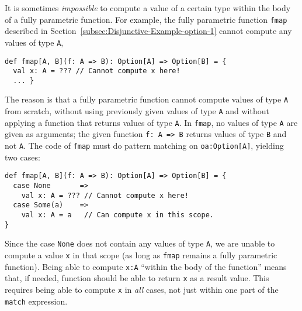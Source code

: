 It is sometimes \emph{impossible} to compute a value of a certain
type within the body of a fully parametric function. For example,
the fully parametric function \lstinline!fmap!
described in Section~\ref{subsec:Disjunctive-Example-option-1} cannot
compute any values of type \lstinline!A!,
\begin{lstlisting}
def fmap[A, B](f: A => B): Option[A] => Option[B] = {
  val x: A = ??? // Cannot compute x here!
  ... }
\end{lstlisting}
The reason is that a fully parametric function cannot compute values
of type \lstinline!A! from
scratch, without using previously given values of type \lstinline!A!
and without applying a function that returns values of type \lstinline!A!.
In \lstinline!fmap!, no
values of type \lstinline!A!
are given as arguments; the given function \lstinline!f: A => B!
returns values of type \lstinline!B!
and not \lstinline!A!.
The code of \lstinline!fmap!
must do pattern matching on \lstinline!oa:Option[A]!,
yielding two cases:
\begin{lstlisting}
def fmap[A, B](f: A => B): Option[A] => Option[B] = {
  case None       => 
    val x: A = ??? // Cannot compute x here!
  case Some(a)    =>
    val x: A = a   // Can compute x in this scope.
}
\end{lstlisting}
Since the case \lstinline!None!
does not contain any values of type \lstinline!A!,
we are unable to compute a value \lstinline!x!
in that scope (as long as \lstinline!fmap!
remains a fully parametric function). Being able to compute \lstinline!x:A!
``within the body of the function'' means that, if needed, function
should be able to return \lstinline!x!
as a result value. This requires being able to compute \lstinline!x!
in \emph{all} cases, not just within one part of the \lstinline!match!
expression. 

